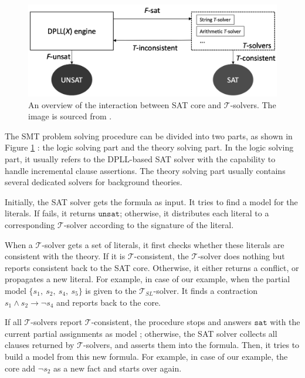 \begin{figure}[htb]
	\begin{center}
		\includegraphics[width=0.8\linewidth]{pictures/dpll_arc.png}
	\end{center}
	\caption{An overview of the interaction between SAT core and $\mathcal{T}$-solvers. The image is sourced from \cite{main_phd}.}
	\label{fig:dpll_architecture}
\end{figure}

The SMT problem solving procedure  can be divided into two parts, as shown in Figure \ref{fig:dpll_architecture} : the logic solving part and the theory solving part. In the logic solving part, it usually refers to the DPLL-based SAT solver with  the capability to handle incremental clause assertions. The theory solving part usually contains several dedicated solvers for background theories. 

Initially, the SAT solver gets the formula as input. It tries to find a model for the literals. If fails, it returns $\texttt{unsat}$; otherwise, it distributes each literal to a corresponding $\mathcal{T}$-solver according to the signature of the literal.

When a $\mathcal{T}$-solver gets a set of literals, it first checks whether these literals are consistent with the theory. If it is $\mathcal{T}$-consistent, the $\mathcal{T}$-solver does nothing but reports consistent back to the SAT core. Otherwise, it either returns a conflict, or propagates a new literal. For example,  in case of our example, when the partial model $\{ s_1 ,\ s_2 ,\ s_4, \ s_5 \}$ is given to the $\mathcal{T}_{SL}$-solver. It finds a  contraction $s_1 \wedge s_2 \to \neg s_4$ and reports back to the core. 

If all $\mathcal{T}$-solvers report $\mathcal{T}$-consistent, the procedure stops and answers $\texttt{sat}$ with the current partial assignments as model ; otherwise, the SAT solver collects all clauses returned by $\mathcal{T}$-solvers, and asserts them into the formula. Then, it tries to build a model from this new formula. For example,  in case of our example, the core add $\neg s_2$ as a new fact and starts over again.